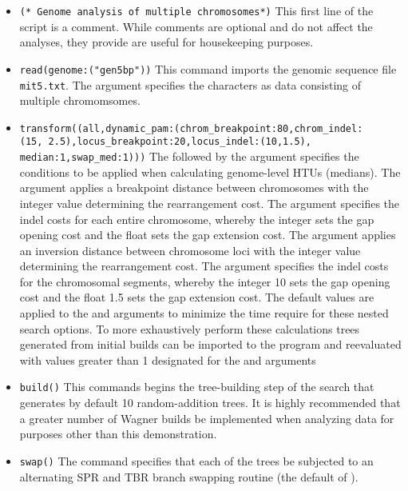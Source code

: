 \begin{itemize}
\item \texttt{(* Genome analysis of multiple chromosomes*)} This first line of the script is a comment. While comments are optional and do not affect the analyses, they provide are useful for housekeeping purposes.
\item \texttt{read(genome:("gen5bp"))} This command imports the genomic sequence file \texttt{mit5.txt}. The argument  specifies the characters as data consisting of multiple chromomsomes.
\item \texttt{transform((all,dynamic\_pam:(chrom\_breakpoint:80,chrom\_indel:\\(15, 2.5),locus\_breakpoint:20,locus\_indel:(10,1.5),\\median:1,swap\_med:1)))}  The  followed by the argument  specifies the conditions to be applied when calculating genome-level HTUs (medians). The argument  applies a breakpoint distance between chromosomes with the integer value determining the rearrangement cost. The argument  specifies the indel costs for each entire chromosome, whereby the integer sets the gap opening cost and the float sets the gap extension cost.  The argument  applies an inversion distance between chromosome loci with the integer value determining the rearrangement cost. The argument  specifies the indel costs for the chromosomal segments, whereby the integer 10 sets the gap opening cost and the float 1.5 sets the gap extension cost.  The default values are applied to the  and  arguments to minimize the time require for these nested search options.   To more exhaustively perform these calculations trees generated from initial builds can be imported to the program and reevaluated with values greater than 1 designated for the  and  arguments
\item \texttt{build()} This commands begins the tree-building step of the search that generates by default 10 random-addition trees.  It is highly recommended that a greater number of Wagner builds be implemented when analyzing data for purposes other than this demonstration.
\item \texttt{swap()} The  command specifies that each of the trees be subjected to an alternating SPR and TBR branch swapping routine (the default of \poy).

\end{itemize}
